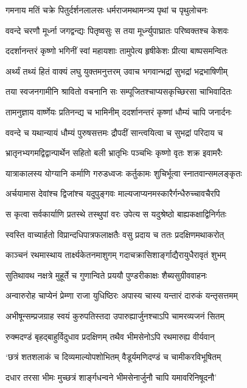 \twolineshloka
{गमनाय मतिं चक्रे पितुर्दर्शनलालसः}
{धर्मराजमथामन्त्र्य पृथां च पृथुलोचनः}


\twolineshloka
{ववन्दे चरणौ मूर्ध्ना जगद्वन्द्यः पितृष्वसुः}
{स तया मूर्ध्न्युपाघ्रातः परिष्वक्तश्च केशवः}


\twolineshloka
{ददर्शानन्तरं कृष्णो भगिनीं स्वां महायशाः}
{तामुपेत्य हृषीकेशः प्रीत्या बाष्पसमन्वितः}


\twolineshloka
{अर्थ्यं तथ्यं हितं वाक्यं लघु युक्तमनुत्तरम्}
{उवाच भगवान्भद्रां सुभद्रां भद्रभाषिणीम्}


\twolineshloka
{तया स्वजनगामीनि श्रावितो वचनानि सः}
{सम्पूजितश्चाप्यसकृच्छिरसा चाभिवादितः}


\twolineshloka
{तामनुज्ञाय वार्ष्णेयः प्रतिनन्द्य च भामिनीम्}
{ददर्शानन्तरं कृष्णां धौम्यं चापि जनार्दनः}


\twolineshloka
{ववन्दे च यथान्यायं धौम्यं पुरुषसत्तमः}
{द्रौपदीं सान्त्वयित्वा च सुभद्रां परिदाय च}


\twolineshloka
{भ्रातृनभ्यगमद्विद्वान्पार्थेन सहितो बली}
{भ्रातृभिः पञ्चभिः कृष्णो वृतः शक्र इवामरैः}


\twolineshloka
{यात्राकालस्य योग्यानि कर्माणि गरुडध्वजः}
{कर्तुकामः शुचिर्भूत्वा स्नातवान्समलङ्कृतः}


\twolineshloka
{अर्चयामास देवांश्च द्विजांश्च यदुपुङ्गवः}
{माल्यजाप्यनमस्कारैर्गन्धैरुच्चावचैरपि}


\twolineshloka
{स कृत्वा सर्वकार्याणि प्रतस्थे तस्थुपां वरः}
{उपेत्य स यदुश्रेष्ठो बाह्यकक्षाद्विनिर्गतः}


\twolineshloka
{स्वस्ति वाच्यार्हतो विप्रान्दधिपात्रफलाक्षतैः}
{वसु प्रदाय च ततः प्रदक्षिणमथाकरोत्}


\twolineshloka
{काञ्चनं रथमास्थाय तार्क्ष्यकेतनमाशुगम्}
{गदाचक्रासिशार्ङ्गाद्यैरायुधैरावृतं शुभम्}


\twolineshloka
{सुतिथावथ नक्षत्रे मुहूर्ते च गुणान्विते}
{प्रययौ पुण्डरीकाक्षः शैब्यसुग्रीववाहनः}


\twolineshloka
{अन्वारुरोह चाप्येनं प्रेम्णा राजा युधिष्ठिरः}
{अपास्य चास्य यन्तारं दारुकं यन्तृसत्तमम्}


\twolineshloka
{अभीषून्सम्प्रजग्राह स्वयं कुरुपतिस्तदा}
{उपारुह्यार्जुनश्चाऽपि चामरव्यजनं सितम्}


\twolineshloka
{रुक्मदण्डं बृहद्बाहुर्विदुधाव प्रदक्षिणम्}
{तथैव भीमसेनोऽपि रथमारुह्य वीर्यवान्}


\threelineshloka
{`छत्रं शतशलाकं च दिव्यमाल्योपशोभितम्}
{वैडूर्यमणिदण्डं च चामीकरविभूषितम्}
{}


\twolineshloka
{दधार तरसा भीमः मुच्छत्रं शार्ङ्गधन्वने}
{भीमसेनार्जुनौ चापि यमावरिनिषूदनौ'}


